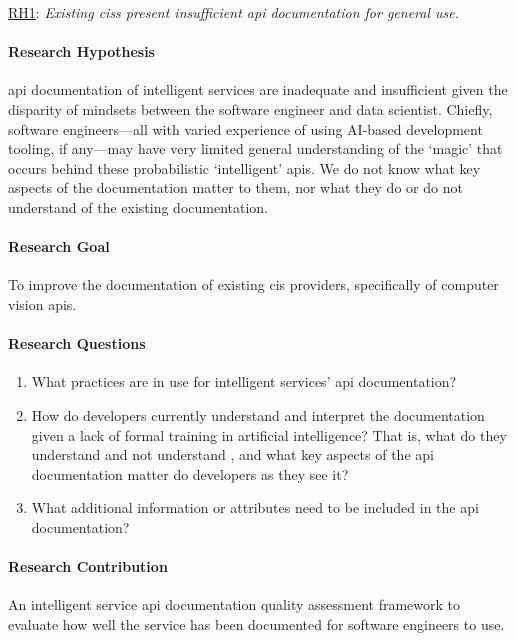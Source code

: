 \begin{titled-frame}{\underline{RH1}: \textit{Existing \glspl{cis} present insufficient \gls{api} documentation for general use.} }
\vspace{-12pt}
\paragraph{Research Hypothesis}
\gls{api} documentation of intelligent services are inadequate and insufficient given the disparity of mindsets between the software engineer and data scientist. Chiefly, software engineers---all with varied experience of using AI-based development tooling, if any---may have very limited general understanding of the `magic' that occurs behind these probabilistic `intelligent' \glspl{api}. We do not know what key aspects of the documentation matter to them, nor what they do or do not understand of the existing documentation.

\paragraph{Research Goal}
To improve the documentation of existing \gls{cis} providers, specifically of computer vision \glspl{api}.

\paragraph{Research Questions}
\begin{enumerate}[label=\textbf{RQ1.\arabic*.}, ref=RQ1.\arabic*, leftmargin=3.5\parindent, rightmargin=1\parindent]
  \item What practices are in use for intelligent services' \gls{api} documentation?
  \label{rqs:apidoc:what-is-in-use}
  
  \item How do developers currently understand and interpret the documentation given a lack of formal training in artificial intelligence? That is, what do they understand and not understand , and what key aspects of the \gls{api} documentation matter do developers as they see it?
  \label{rqs:apidoc:how-do-devs-understand-it}
  
  \item What additional information or attributes need to be included in the \gls{api} documentation?
  \label{rqs:apidoc:what-additional-information-needed}
\end{enumerate}

\paragraph{Research Contribution} An intelligent service \gls{api} documentation quality assessment framework to evaluate how well the service has been documented for software engineers to use.


\end{titled-frame}
